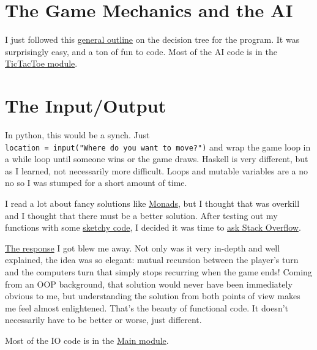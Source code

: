 \documentclass[12pt]{article}
\begin{document}
  \section{The Game Mechanics and the
  AI}\label{the-game-mechanics-and-the-ai}

  I just followed this
  \href{http://programmers.stackexchange.com/questions/213559/algorithm-to-create-an-tictactoe-game-ai}{general
  outline} on the decision tree for the program. It was surprisingly easy,
  and a ton of fun to code. Most of the AI code is in the
  \href{https://github.com/2016rshah/Tic-Hack-Toe/blob/master/src/TicTacToe.hs}{TicTacToe
  module}.

  \section{The Input/Output}\label{the-inputoutput}

  In python, this would be a synch. Just
  \texttt{location\ =\ input("Where\ do\ you\ want\ to\ move?")} and wrap
  the game loop in a while loop until someone wins or the game draws.
  Haskell is very different, but as I learned, not necessarily more
  difficult. Loops and mutable variables are a no no so I was stumped for
  a short amount of time.

  I read a lot about fancy solutions like
  \href{http://projects.haskell.org/operational/examples/TicTacToe.hs.html}{Monads},
  but I thought that was overkill and I thought that there must be a
  better solution. After testing out my functions with some
  \href{https://github.com/2016rshah/Tic-Hack-Toe/commit/201ef6f4ab5bdcd74675f582dcabe47468d49522}{sketchy
  code}, I decided it was time to
  \href{http://stackoverflow.com/questions/32670948/take-input-from-user-until-tic-tac-toe-game-ends}{ask
  Stack Overflow}.

  \href{http://stackoverflow.com/a/32671373/3861396}{The response} I got
  blew me away. Not only was it very in-depth and well explained, the idea
  was so elegant: mutual recursion between the player's turn and the
  computers turn that simply stops recurring when the game ends! Coming
  from an OOP background, that solution would never have been immediately
  obvious to me, but understanding the solution from both points of view
  makes me feel almost enlightened. That's the beauty of functional code.
  It doesn't necessarily have to be better or worse, just different.

  Most of the IO code is in the
  \href{https://github.com/2016rshah/Tic-Hack-Toe/blob/master/src/Main.hs}{Main
  module}.
\end{document}
